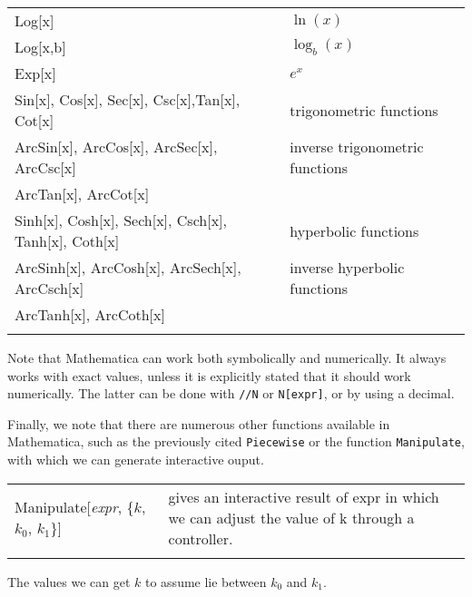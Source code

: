 \begin{tabular}{>{\hfill}m{9cm}p{8cm}}
	Log[x]			&	$\ln(x)$\\
	Log[x,b]		&	$\log_b(x)$\\
	Exp[x]			&	$e^x$\\
	Sin[x],  Cos[x], Sec[x],  Csc[x],Tan[x], Cot[x]							&	trigonometric functions\\
	ArcSin[x],  ArcCos[x], ArcSec[x],  ArcCsc[x]		&	inverse trigonometric functions \\
	ArcTan[x], ArcCot[x]			&	\\
	\ifanalysis
	Sinh[x],  Cosh[x], Sech[x],  Csch[x], Tanh[x], Coth[x]						&	hyperbolic functions \\
	ArcSinh[x],  ArcCosh[x], ArcSech[x],  ArcCsch[x]	&	inverse hyperbolic functions\\
	ArcTanh[x], ArcCoth[x]	&	\\\fi
	\multicolumn{2}{l}{}
\end{tabular}

Note that Mathematica can work both symbolically and numerically. It always works with exact values, unless it is explicitly stated that it should work numerically. The latter can be done with \lstinline{//N} or \lstinline{N[expr]},  or by using a decimal.

Finally, we note that there are numerous other functions available in Mathematica, such as the previously cited \lstinline|Piecewise| or the function \lstinline|Manipulate|, with which we can generate interactive ouput.\\

\begin{tabular}{>{\hfill}p{6cm}p{11cm}}
	Manipulate[\textit{expr}, \{$k$, $k_0$, $k_1$\}]	& 	gives an interactive result of expr in which we can adjust the value of k through a controller.\\ 
	\multicolumn{2}{l}{} 
\end{tabular}

The values we can get $k$ to assume lie between $k_0$ and $k_1$. 


